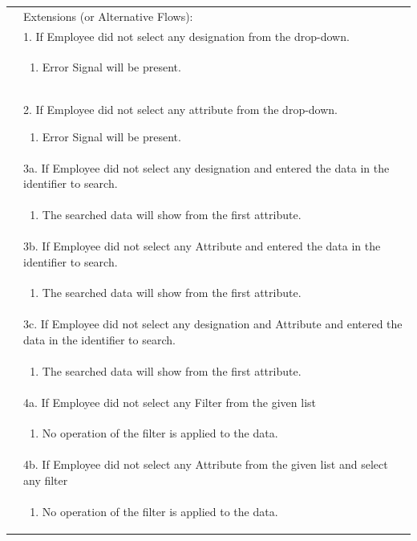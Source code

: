 \documentclass[12pt,a4paper]{article}
\begin{document}
\begin{longtable}{| p{3cm}|p{12cm}|}
&Extensions (or Alternative Flows):\\

& 1. If Employee did not select any designation from the drop-down. \\
& \begin{enumerate}
		\item Error Signal will be present.
	\end{enumerate}
\\ 

      & 2. If Employee did not select any attribute from the drop-down.
 	\begin{enumerate}
		\item Error Signal will be present.
	\end{enumerate}
\\ 
& 3a. If Employee did not select any designation and entered the data in the identifier to search. \\
& \begin{enumerate}
		\item The searched data will show from the first attribute.
	\end{enumerate}
\\
& 3b. If Employee did not select any Attribute and entered the data in the identifier to search. \\
& \begin{enumerate}
		\item The searched data will show from the first attribute.
	\end{enumerate}
\\ 
& 3c. If Employee did not select any designation and  Attribute and entered the data in the identifier to search. \\
& \begin{enumerate}
		\item The searched data will show from the first attribute.
	\end{enumerate}
\\ 

& 4a. If Employee did not select any Filter from the given list \\
& \begin{enumerate}
		\item No operation of the filter is applied to the data.
	\end{enumerate}
\\ 
& 4b. If Employee did not select any Attribute from the given list and select any filter  \\
& \begin{enumerate}
		\item No operation of the filter is applied to the data.
	\end{enumerate}
\\ 


\end{longtable}
\end{document}
